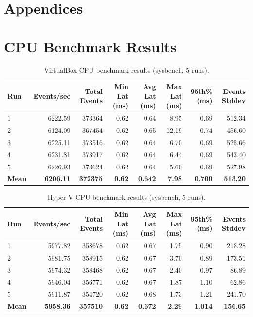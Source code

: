 \documentclass[a4paper, 12pt]{article}
\theoremstyle{plain}
\theoremstyle{definition}
\theoremstyle{remark}
\begin{document}
    \newpage
    \printbibliography
    \newpage
    \begin{landscape}
    \appendix
    \section*{Appendices}
    \section{CPU Benchmark Results}
    \begin{table}[H]
    \centering
    \caption{VirtualBox CPU benchmark results (sysbench, 5 runs).}
    \label{tab:cpu-vbox}
    \begin{tabular}{lrrrrrrr}
    \hline
    \textbf{Run} & \textbf{Events/sec} & \textbf{Total Events} & \textbf{Min Lat (ms)} & \textbf{Avg Lat (ms)} & \textbf{Max Lat (ms)} & \textbf{95th\% (ms)} & \textbf{Events Stddev} \\
    \hline
    1 & 6222.59 & 373364 & 0.62 & 0.64 & 8.95  & 0.69 & 512.34 \\
    2 & 6124.09 & 367454 & 0.62 & 0.65 & 12.19 & 0.74 & 456.60 \\
    3 & 6225.11 & 373516 & 0.62 & 0.64 & 6.70  & 0.69 & 525.66 \\
    4 & 6231.81 & 373917 & 0.62 & 0.64 & 6.44  & 0.69 & 543.40 \\
    5 & 6226.93 & 373624 & 0.62 & 0.64 & 5.60  & 0.69 & 527.98 \\
    \hline
    \textbf{Mean} & \textbf{6206.11} & \textbf{372375} & \textbf{0.62} & \textbf{0.642} & \textbf{7.98} & \textbf{0.700} & \textbf{513.20} \\
    \hline
    \end{tabular}
    \end{table}

    \begin{table}[H]
    \centering
    \caption{Hyper-V CPU benchmark results (sysbench, 5 runs).}
    \label{tab:cpu-hyperv}
    \begin{tabular}{lrrrrrrr}
    \hline
    \textbf{Run} & \textbf{Events/sec} & \textbf{Total Events} & \textbf{Min Lat (ms)} & \textbf{Avg Lat (ms)} & \textbf{Max Lat (ms)} & \textbf{95th\% (ms)} & \textbf{Events Stddev} \\
    \hline
    1 & 5977.82 & 358678 & 0.62 & 0.67 & 1.75 & 0.90 & 218.28 \\
    2 & 5981.75 & 358915 & 0.62 & 0.67 & 3.70 & 0.89 & 173.51 \\
    3 & 5974.32 & 358468 & 0.62 & 0.67 & 2.40 & 0.97 & 86.89 \\
    4 & 5946.04 & 356771 & 0.62 & 0.67 & 1.87 & 1.10 & 62.86 \\
    5 & 5911.87 & 354720 & 0.62 & 0.68 & 1.73 & 1.21 & 241.70 \\
    \hline
    \textbf{Mean} & \textbf{5958.36} & \textbf{357510} & \textbf{0.62} & \textbf{0.672} & \textbf{2.29} & \textbf{1.014} & \textbf{156.65} \\
    \hline
    \end{tabular}
    \end{table}
    \end{landscape}
\end{document}
